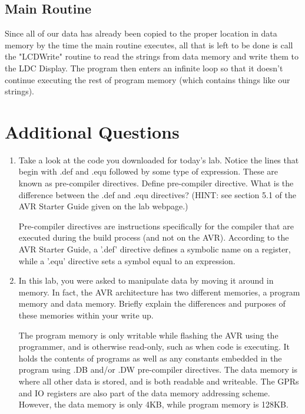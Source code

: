 \documentclass[12pt,letterpaper]{article}
\begin{document}
\subsection{Main Routine}

Since all of our data has already been copied to the proper location in data memory by the time the main routine executes, all that is left to be done is call the "LCDWrite" routine to read the strings from data memory and write them to the LDC Display.  The program then enters an infinite loop so that it doesn't continue executing the rest of program memory (which contains things like our strings).

\section{Additional Questions}
\begin{enumerate}

    \item Take a look at the code you downloaded for today’s lab. Notice the
        lines that begin with .def and .equ followed by some type of
        expression. These are known as pre-compiler directives. Define
        pre-compiler directive. What is the difference between the .def and
        .equ directives? (HINT: see section 5.1 of the AVR Starter Guide given
        on the lab webpage.)

        Pre-compiler directives are instructions specifically for the compiler
        that are executed during the build process (and not on the AVR).
        According to the AVR Starter Guide, a '.def' directive defines a
        symbolic name on a register, while a '.equ' directive sets a symbol
        equal to an expression.

    \item In this lab, you were asked to manipulate data by moving it around in
        memory. In fact, the AVR architecture has two different memories, a
        program memory and data memory. Briefly explain the differences and
        purposes of these memories within your write up.

        The program memory is only writable while flashing the AVR using the
        programmer, and is otherwise read-only, such as when code is executing.
        It holds the contents of programs as well as any constants embedded in
        the program using .DB and/or .DW pre-compiler directives.  The data
        memory is where all other data is stored, and is both readable and
        writeable.  The GPRs and IO registers are also part of the data memory
        addressing scheme.  However, the data memory is only 4KB, while program
        memory is 128KB.


\end{enumerate}
\end{document}
